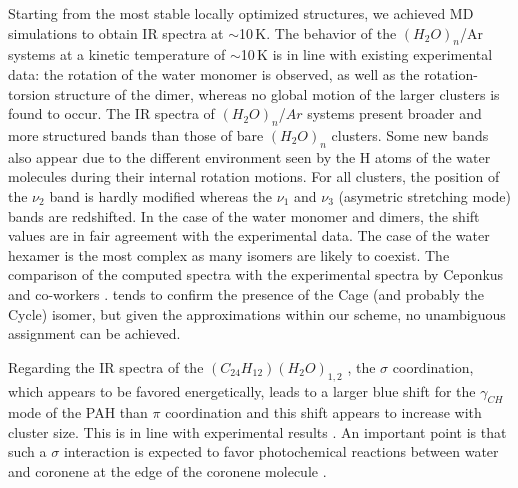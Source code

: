 \documentclass[]{interact}
\theoremstyle{plain}%
\theoremstyle{definition}
\theoremstyle{remark}
\begin{document}
 
 Starting from the most stable locally optimized structures, we achieved MD simulations to obtain IR spectra at $\sim$10\,K. 
 The behavior of the $(H_{2}O)_{n}$/Ar systems at a kinetic temperature of $\sim$10\,K is in line with existing experimental data: the rotation of the water monomer is observed, as well as the rotation-torsion structure of the dimer, whereas no global motion of the larger clusters is found  to occur.  The IR spectra of $(H_2O)_n$/$Ar$ systems present broader and more structured bands than those of bare $(H_2O)_n$ clusters.  Some new bands also appear due to the different environment seen by the H atoms of the water molecules during their internal rotation motions. For all clusters, the position of the $\nu_2$ band is hardly modified whereas the $\nu_1$ and $\nu_3$ (asymetric stretching mode) bands are redshifted. In the case of the water monomer and dimers, the shift  values are in fair agreement with the experimental data. 
The case of the water hexamer is the most complex as many isomers are likely to coexist. The comparison of the computed spectra with the experimental spectra by Ceponkus and co-workers  \cite{Ceponkus2012}. %
 tends to confirm the presence of the Cage (and probably the Cycle) isomer, but given the approximations within our scheme, no  unambiguous assignment can be achieved.
 
Regarding the IR spectra of the $(C_{24}H_{12})(H_{2}O)_{1,2}$ , the $\sigma$ coordination, which appears to be favored energetically,  leads to a larger blue shift for the $\gamma_{CH}$  mode of the PAH than  $\pi$ coordination and this shift appears to increase with cluster size. This is in line with experimental results \cite{WaterCorMat_PCCP17}. An important point is that such a $\sigma$ interaction is expected to favor photochemical reactions between water and coronene at the edge of the coronene molecule \cite{Noble2017}.
   
\end{document}

